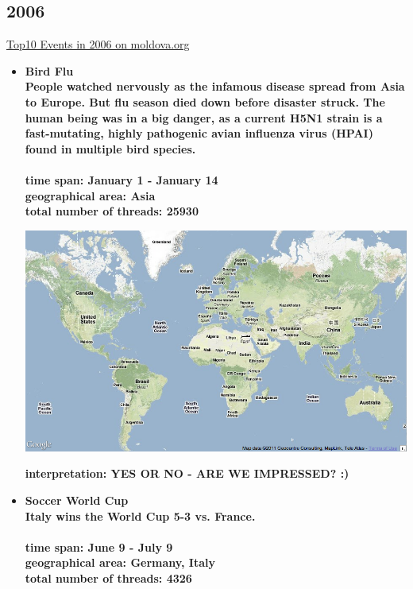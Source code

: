 \documentclass[11pt,a4paper,english]{article}
\begin{document}
			\subsection{2006}
			\href{http://social.moldova.org/news/10-most-important-world-events-of-2006-217385-eng.html}{Top10 Events in 2006 on moldova.org}
				\begin{itemize}
					\item \bf Bird Flu \rm
						\\ People watched nervously as the infamous disease spread from Asia to Europe. But flu season died down before disaster struck. The human being was in a big danger, as a current H5N1 strain is a fast-mutating, highly pathogenic avian influenza virus (HPAI) found in multiple bird species.
						\\\\ \bf time span: \rm January 1 - January 14
						\\ \bf geographical area: \rm Asia
						\\ \bf total number of threads: \rm 25930
						
						\includegraphics[width=130mm]{img/2005-1}
						
						\bf interpretation: \rm YES OR NO - ARE WE IMPRESSED? :)
					
					
					
					\item \bf Soccer World Cup \rm
						\\ Italy wins the World Cup 5-3 vs. France.
						\\\\ \bf time span: \rm June 9 - July 9
						\\ \bf geographical area: \rm Germany, Italy
						\\ \bf total number of threads: \rm 4326
						

\end{itemize}
\end{document}
